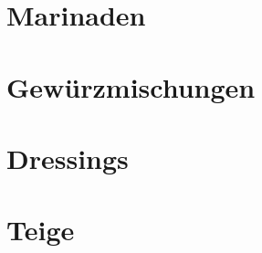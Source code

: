 \documentclass[DIV=11, pagesize, fontsize=11pt, paper=a4, numbers=noenddot]{scrartcl}
\begin{document}
\section{Marinaden}
\newpage{}
\newpage{}
\newpage{}

\section{Gewürzmischungen}
\newpage{}

\section{Dressings}
\newpage{}

\section{Teige}
\newpage{}
\newpage{}
\end{document}
